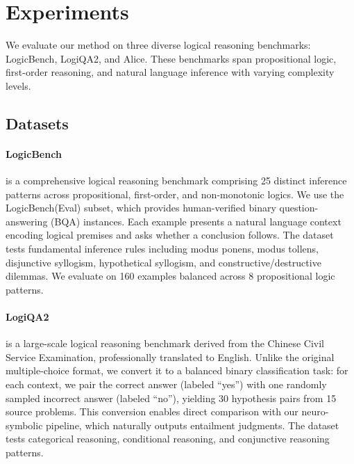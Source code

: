 
\section{Experiments}
\label{sec:experiments}

We evaluate our method on three diverse logical reasoning benchmarks: LogicBench, LogiQA2, and Alice. These benchmarks span propositional logic, first-order reasoning, and natural language inference with varying complexity levels.

\subsection{Datasets}
\label{subsec:datasets}

\paragraph{LogicBench} \citep{parmar2024logicbench} is a comprehensive logical reasoning benchmark comprising 25 distinct inference patterns across propositional, first-order, and non-monotonic logics. We use the LogicBench(Eval) subset, which provides human-verified binary question-answering (BQA) instances. Each example presents a natural language context encoding logical premises and asks whether a conclusion follows. The dataset tests fundamental inference rules including modus ponens, modus tollens, disjunctive syllogism, hypothetical syllogism, and constructive/destructive dilemmas. We evaluate on 160 examples balanced across 8 propositional logic patterns.

\paragraph{LogiQA2} \citep{liu2023logiqa2} is a large-scale logical reasoning benchmark derived from the Chinese Civil Service Examination, professionally translated to English. Unlike the original multiple-choice format, we convert it to a balanced binary classification task: for each context, we pair the correct answer (labeled ``yes'') with one randomly sampled incorrect answer (labeled ``no''), yielding 30 hypothesis pairs from 15 source problems. This conversion enables direct comparison with our neuro-symbolic pipeline, which naturally outputs entailment judgments. The dataset tests categorical reasoning, conditional reasoning, and conjunctive reasoning patterns.

